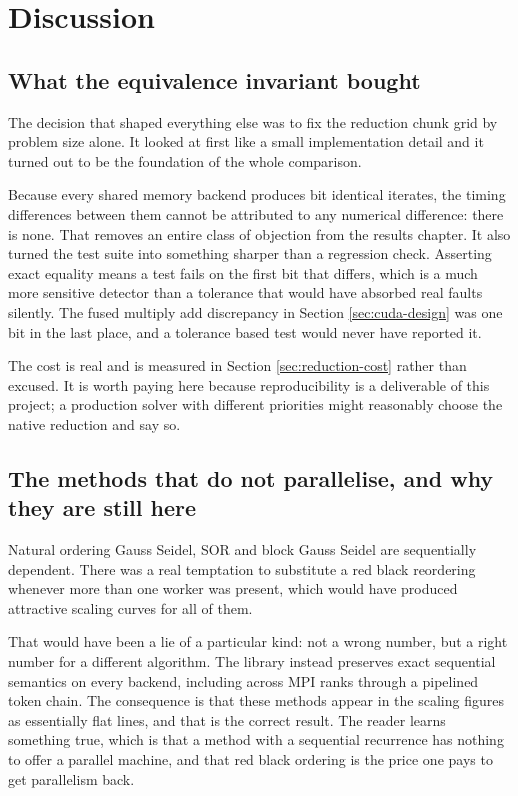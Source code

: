 \chapter{Discussion}
\label{ch:discussion}

\section{What the equivalence invariant bought}

The decision that shaped everything else was to fix the reduction chunk grid by
problem size alone. It looked at first like a small implementation detail and it
turned out to be the foundation of the whole comparison.

Because every shared memory backend produces bit identical iterates, the timing
differences between them cannot be attributed to any numerical difference: there
is none. That removes an entire class of objection from the results chapter. It
also turned the test suite into something sharper than a regression check.
Asserting exact equality means a test fails on the first bit that differs, which
is a much more sensitive detector than a tolerance that would have absorbed real
faults silently. The fused multiply add discrepancy in Section
\ref{sec:cuda-design} was one bit in the last place, and a tolerance based test
would never have reported it.

The cost is real and is measured in Section \ref{sec:reduction-cost} rather than
excused. It is worth paying here because reproducibility is a deliverable of
this project; a production solver with different priorities might reasonably
choose the native reduction and say so.

\section{The methods that do not parallelise, and why they are still here}

Natural ordering Gauss Seidel, SOR and block Gauss Seidel are sequentially
dependent. There was a real temptation to substitute a red black reordering
whenever more than one worker was present, which would have produced attractive
scaling curves for all of them.

That would have been a lie of a particular kind: not a wrong number, but a right
number for a different algorithm. The library instead preserves exact sequential
semantics on every backend, including across MPI ranks through a pipelined token
chain. The consequence is that these methods appear in the scaling figures as
essentially flat lines, and that is the correct result. The reader learns
something true, which is that a method with a sequential recurrence has nothing
to offer a parallel machine, and that red black ordering is the price one pays
to get parallelism back.

